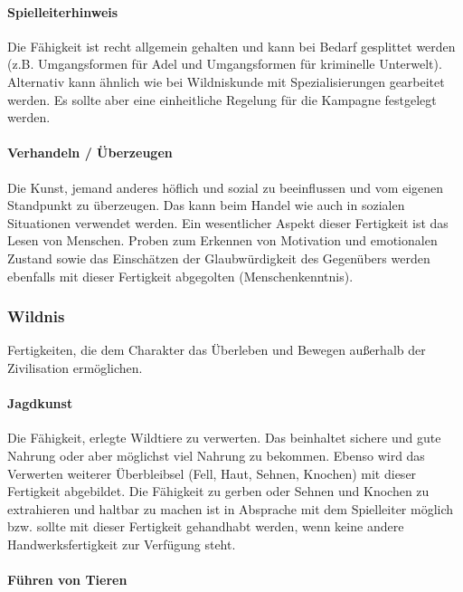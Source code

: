 \documentclass{article}
\begin{document}
\begin{mdframed}[hidealllines=true, backgroundcolor=black!10]
\paragraph{Spielleiterhinweis}

Die Fähigkeit ist recht allgemein gehalten und kann bei Bedarf gesplittet werden (z.B. Umgangsformen für Adel und
Umgangsformen für kriminelle Unterwelt). Alternativ kann ähnlich wie bei Wildniskunde mit Spezialisierungen gearbeitet
werden. Es sollte aber eine einheitliche Regelung für die Kampagne festgelegt werden.

\end{mdframed}
\paragraph{Verhandeln / Überzeugen}

Die Kunst, jemand anderes höflich und sozial zu beeinflussen und vom eigenen Standpunkt zu überzeugen. Das kann beim
Handel wie auch in sozialen Situationen verwendet werden. Ein wesentlicher Aspekt dieser Fertigkeit ist das Lesen von
Menschen. Proben zum Erkennen von Motivation und emotionalen Zustand sowie das Einschätzen der Glaubwürdigkeit des
Gegenübers werden ebenfalls mit dieser Fertigkeit abgegolten (Menschenkenntnis).

\subsubsection{Wildnis}

Fertigkeiten, die dem Charakter das Überleben und Bewegen außerhalb der Zivilisation ermöglichen.

\paragraph{Jagdkunst}

Die Fähigkeit, erlegte Wildtiere zu verwerten. Das beinhaltet sichere und gute Nahrung oder aber möglichst viel
Nahrung zu bekommen. Ebenso wird das Verwerten weiterer Überbleibsel (Fell, Haut, Sehnen, Knochen) mit dieser
Fertigkeit abgebildet. Die Fähigkeit zu gerben oder Sehnen und Knochen zu extrahieren und haltbar zu machen ist
in Absprache mit dem Spielleiter möglich bzw. sollte mit dieser Fertigkeit gehandhabt werden, wenn keine andere
Handwerksfertigkeit zur Verfügung steht.

\paragraph{Führen von Tieren}
\end{document}
